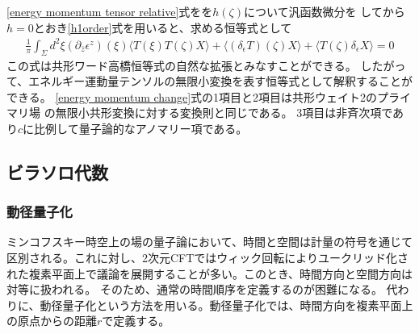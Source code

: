 \documentclass[11pt, dvipdfmx]{article}
\numberwithin{equation}{section}
\newcommand{\blankline}{\par\vspace{\baselineskip}} %
\begin{document}
\eqref{energy momentum tensor relative}式をを$h(\zeta)$について汎函数微分を
してから$h=0$とおき\eqref{h1order}式を用いると、求める恒等式として
\begin{align}
    \frac{1}{\pi} \int_{\Sigma} d^2\xi (\partial_{\bar{z}}\epsilon^z)(\xi)\langle T(\xi)T(\zeta)X \rangle + \langle (\delta_\epsilon T)(\zeta)X \rangle + \langle T(\zeta)\delta_\epsilon X \rangle = 0
\end{align}
この式は共形ワード高橋恒等式の自然な拡張とみなすことができる。
したがって、エネルギー運動量テンソルの無限小変換を表す恒等式として解釈することができる。
\eqref{energy momentum change}式の1項目と2項目は共形ウェイト2のプライマリ場
の無限小共形変換に対する変換則と同じである。
3項目は非斉次項であり$c$に比例して量子論的なアノマリー項である。
\subsection{ビラソロ代数}
\subsubsection{動径量子化}
ミンコフスキー時空上の場の量子論において、時間と空間は計量の符号を通じて区別される。これに対し、2次元CFTではウィック回転によりユークリッド化された複素平面上で議論を展開することが多い。このとき、時間方向と空間方向は対等に扱われる。
そのため、通常の時間順序を定義するのが困難になる。
代わりに、動径量子化という方法を用いる。動径量子化では、時間方向を複素平面上の原点からの距離$r$で定義する。
\blankline
\end{document}
